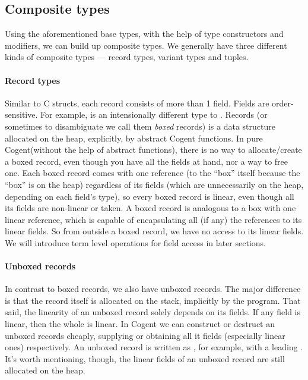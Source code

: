 \documentclass[a4paper]{article}
\newcommand{\cogent}{Cogent\xspace}
\newcommand{\Cogent}{\cogent\xspace}
\begin{document}
\subsection{Composite types}

Using the aforementioned base types, with the help of type constructors and modifiers, we can build up
composite types. We generally have three different kinds of composite types --- record types, variant types
and tuples.

\paragraph{Record types} Similar to C structs, each record consists of more than 1 field. Fields are order-sensitive.
For example,  is an intensionally different type to .
Records (or sometimes to disambiguate we call them \emph{boxed} records) is a data structure allocated on the heap,
explicitly, by abstract \Cogent functions. In pure \Cogent (without the help of abstract functions), there is no way to allocate/create
a boxed record, even though you have all the fields at hand, nor a way to free one. Each boxed record comes with
one reference (to the ``box'' itself because the ``box'' is on the heap) regardless of its fields (which
are unnecessarily on the heap, depending on each field's type), so every
boxed record is linear, even though all its fields are non-linear or taken. A boxed record is analogous to
a box with one linear reference, which is capable of encapsulating all (if any) the references to its linear fields. So from outside
a boxed record, we have no access to its linear fields. We will introduce term level operations for field access in later sections.

\paragraph{Unboxed records} In contrast to boxed records, we also have unboxed records. The major difference is that
the record itself is allocated on the stack, implicitly by the program. That said, the linearity of an unboxed record
solely depends on its fields. If any field is linear, then the whole is linear. In \cogent we can construct or destruct an
unboxed records cheaply, supplying or obtaining all it fields (especially linear ones) respectively. An unboxed record
is written as , for example, with a leading \code{\#}. It's worth mentioning, though, the linear
fields of an unboxed record are still allocated on the heap.
\end{document}
